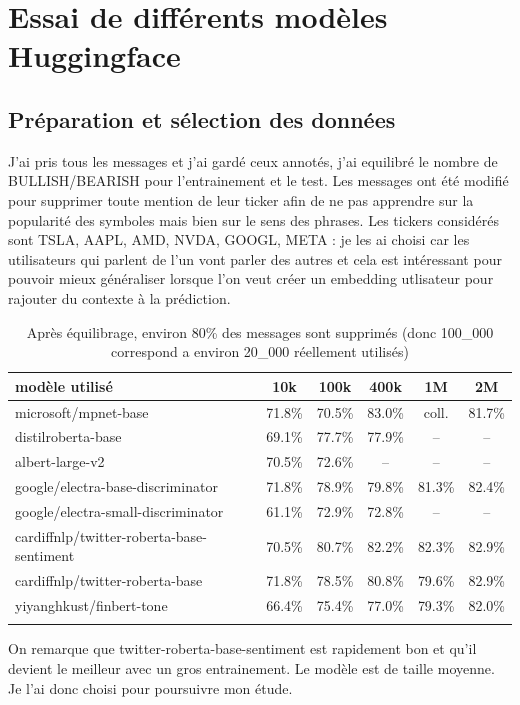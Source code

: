 \documentclass[12pt]{article}
\begin{document}
\section{Essai de différents modèles Huggingface}

\subsection{Préparation et sélection des données}
J'ai pris tous les messages et j'ai gardé ceux annotés, j'ai equilibré le nombre de BULLISH/BEARISH pour l'entrainement et le test.
Les messages ont été modifié pour supprimer toute mention de leur ticker afin de ne pas apprendre sur la popularité des symboles mais bien sur le sens des phrases.
Les tickers considérés sont TSLA, AAPL, AMD, NVDA, GOOGL, META : je les ai choisi car les utilisateurs qui parlent de l'un vont parler des autres et cela est intéressant pour pouvoir mieux généraliser lorsque l'on veut créer un embedding utlisateur pour rajouter du contexte à la prédiction.


\begin{longtable}{lccccc}
\caption{Modèle utilisé / nombre de messages utilisés / précision sur dataset équilibré} \\
\toprule
\textbf{modèle utilisé} & 10k & 100k & 400k & 1M & 2M \\
\midrule
microsoft/mpnet-base & 71.8\% & 70.5\% & 83.0\% & coll. & 81.7\% \\
distilroberta-base & 69.1\% & 77.7\% & 77.9\% & -- & -- \\
albert-large-v2 & 70.5\% & 72.6\% & -- & -- & -- \\
google/electra-base-discriminator & 71.8\% & 78.9\% & 79.8\% & 81.3\% & 82.4\% \\
google/electra-small-discriminator & 61.1\% & 72.9\% & 72.8\% & -- & -- \\
cardiffnlp/twitter-roberta-base-sentiment & 70.5\% & 80.7\% & 82.2\% & 82.3\% & 82.9\% \\
cardiffnlp/twitter-roberta-base & 71.8\% & 78.5\% & 80.8\% & 79.6\% & 82.9\% \\
yiyanghkust/finbert-tone & 66.4\% & 75.4\% & 77.0\% & 79.3\% & 82.0\% \\
\bottomrule
\caption*{\small Après équilibrage, environ 80\% des messages sont supprimés (donc 100\_000 correspond a environ 20\_000 réellement utilisés)}
\end{longtable}


On remarque que twitter-roberta-base-sentiment est rapidement bon et qu'il devient le meilleur avec un gros entrainement. Le modèle est de taille moyenne.
Je l'ai donc choisi pour poursuivre mon étude.
\end{document}
